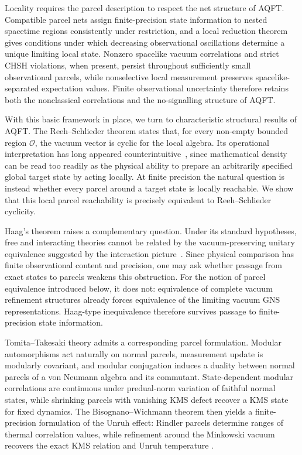 \documentclass[11pt]{article}
\begin{document}
Locality requires the parcel description to respect the net structure of
AQFT. Compatible parcel nets assign finite-precision state information to
nested spacetime regions consistently under restriction, and a local
reduction theorem gives conditions under which decreasing observational
oscillations determine a unique limiting local state. Nonzero spacelike
vacuum correlations and strict CHSH violations, when present, persist
throughout sufficiently small observational parcels, while nonselective
local measurement preserves spacelike-separated expectation values.
Finite observational uncertainty therefore retains both the
nonclassical correlations and the no-signalling structure of AQFT.

With this basic framework in place, we turn to characteristic structural
results of AQFT. The Reeh--Schlieder theorem states that, for every
non-empty bounded region $\mathcal O$, the vacuum vector is cyclic for
the local algebra. Its operational interpretation has long appeared
counterintuitive~\cite{Halvorson2001,VALENTE2014147}, since mathematical
density can be read too readily as the physical ability to prepare an
arbitrarily specified global target state by acting locally. At finite
precision the natural question is instead whether every parcel around a
target state is locally reachable. We show that this local parcel
reachability is precisely equivalent to Reeh--Schlieder cyclicity.

Haag's theorem raises a complementary question. Under its standard
hypotheses, free and interacting theories cannot be related by the
vacuum-preserving unitary equivalence suggested by the interaction
picture~\cite{haag2012local,EarmanFraser2006}. Since physical comparison
has finite observational content and precision, one may ask whether
passage from exact states to parcels weakens this obstruction. For the
notion of parcel equivalence introduced below, it does not: equivalence
of complete vacuum refinement structures already forces equivalence of
the limiting vacuum GNS representations. Haag-type inequivalence
therefore survives passage to finite-precision state information.

Tomita--Takesaki theory admits a corresponding parcel formulation.
Modular automorphisms act naturally on normal parcels, measurement update
is modularly covariant, and modular conjugation induces a duality between
normal parcels of a von Neumann algebra and its commutant. State-dependent
modular correlations are continuous under predual-norm variation of
faithful normal states, while shrinking parcels with vanishing KMS defect
recover a KMS state for fixed dynamics. The Bisognano--Wichmann theorem
then yields a finite-precision formulation of the Unruh effect: Rindler
parcels determine ranges of thermal correlation values, while refinement
around the Minkowski vacuum recovers the exact KMS relation and Unruh
temperature
\cite{bisognanowichmann76,Unruh1976,CrispinoHiguchiMatsas2008}.
\end{document}
